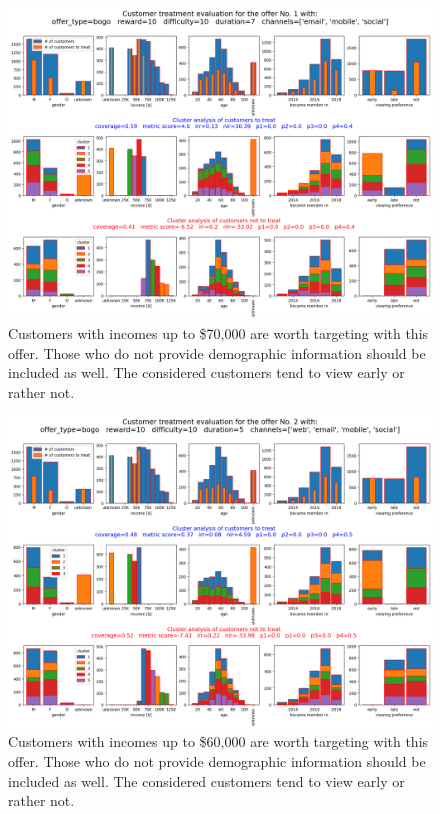 \documentclass[11pt]{article} %
\begin{document}
\begin{figure}[H]
\includegraphics[height=0.5\textheight]{results/results1.png}
\caption{Customers with  incomes up to \$70,000 are worth targeting with this offer.  Those who do not provide demographic information should be included as well. The considered customers tend to view early or rather not. }
\end{figure}
\begin{figure}[H]
\includegraphics[height=0.5\textheight]{results/results2.png}
\caption{Customers with  incomes up to \$60,000 are worth targeting with this offer.  Those who do not provide demographic information should be included as well. The considered customers tend to view early or rather not. }
\end{figure}
\end{document}
